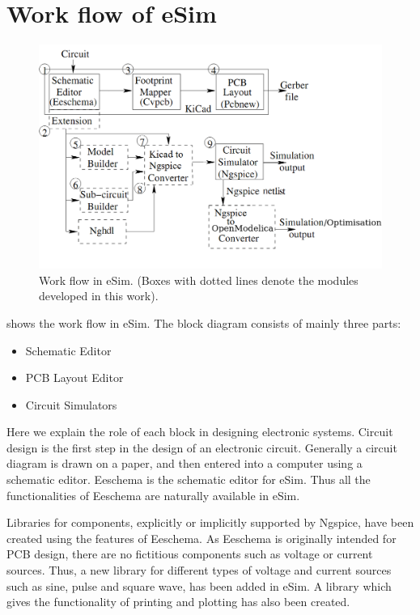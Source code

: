 \section {Work flow of eSim}

\begin{figure}
\centering
\includegraphics[width=\hgfig]
{blockdiagram.png}
\caption{Work flow in eSim. (Boxes with dotted lines denote
  the modules developed in this work).}
\label{blockd}
\end{figure}

 shows the work flow in eSim. The block diagram consists of mainly three parts: 
\begin{itemize}
\item Schematic Editor 
\item PCB Layout Editor  
\item Circuit Simulators
\end{itemize} 



%
Here we explain the role of each block in designing electronic
systems. Circuit design is the first step in the design of an electronic
circuit. Generally a circuit diagram is drawn on a paper, and then
entered into a computer using a schematic editor. Eeschema is the
schematic editor for eSim. Thus all the functionalities of Eeschema
are naturally available in eSim.  

Libraries for
components, explicitly or implicitly supported by Ngspice, have been
created using the features of Eeschema. As Eeschema is originally intended for PCB design, there are
no fictitious components such as voltage or current sources. Thus, a
new library for different types of voltage and current sources such as
sine, pulse and square wave, has been added in eSim. A library
which gives the functionality of printing and plotting has also been
created. 

